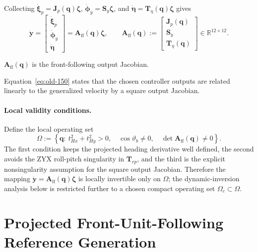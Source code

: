 \documentclass[12pt,a4paper]{report}
\newcommand{\newsymbols}[1]{\par\noindent{}#1\par\vspace{0.35em}}
\newcommand{\formulaannotation}[1]{\par\noindent{}#1\par\vspace{0.35em}}
\begin{document}
Collecting $\dot{\boldsymbol{\xi}}_p = \mathbf{J}_p(\mathbf{q})\boldsymbol{\zeta}$, $\dot{\boldsymbol{\phi}}_y = \mathbf{S}_y\boldsymbol{\zeta}$, and $\dot{\boldsymbol{\eta}} = \mathbf{T}_{\eta}(\mathbf{q})\boldsymbol{\zeta}$ gives
\begin{equation}
\dot{\mathbf{y}} =
\begin{bmatrix}
\dot{\boldsymbol{\xi}}_p \\
\dot{\boldsymbol{\phi}}_y \\
\dot{\boldsymbol{\eta}}
\end{bmatrix}
=
\mathbf{A}_{\mathrm{ff}}(\mathbf{q}) \boldsymbol{\zeta},
\qquad
\mathbf{A}_{\mathrm{ff}}(\mathbf{q}) :=
\begin{bmatrix}
\mathbf{J}_p(\mathbf{q}) \\
\mathbf{S}_y \\
\mathbf{T}_{\eta}(\mathbf{q})
\end{bmatrix}
\in \mathbb{R}^{12 \times 12}.
\label{eq:old-150}
\end{equation}
\newsymbols{$\mathbf{A}_{\mathrm{ff}}(\mathbf{q})$ is the front-following output Jacobian.}
\formulaannotation{Equation~\eqref{eq:old-150} states that the chosen controller outputs are related linearly to the generalized velocity by a square output Jacobian.}

\paragraph{Local validity conditions.}
Define the local operating set
\begin{equation}
\Omega :=
\left\{
\mathbf{q}:\ 
t_{Hx}^{2}+t_{Hy}^{2}>0,\quad
\cos\vartheta_b \neq 0,\quad
\det \mathbf{A}_{\mathrm{ff}}(\mathbf{q}) \neq 0
\right\}.
\end{equation}
The first condition keeps the projected heading derivative well defined, the second avoids the ZYX roll-pitch singularity in $\mathbf{T}_{rp}$, and the third is the explicit nonsingularity assumption for the square output Jacobian. Therefore the mapping $\dot{\mathbf{y}}=\mathbf{A}_{\mathrm{ff}}(\mathbf{q})\boldsymbol{\zeta}$ is locally invertible only on $\Omega$; the dynamic-inversion analysis below is restricted further to a chosen compact operating set $\Omega_c \subset \Omega$.

\section{Projected Front-Unit-Following Reference Generation}
\end{document}

